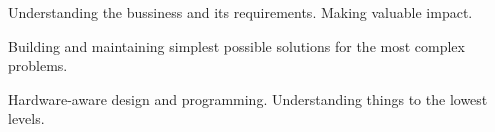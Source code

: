 

\begin{cventries}
    \begin{cvitems}
      \item{Understanding the bussiness and its requirements. Making valuable impact.}
      \item{Building and maintaining simplest possible solutions for the most complex problems.}
      \item{Hardware-aware design and programming. Understanding things to the lowest levels.}
    \end{cvitems}

  \bigskip
\end{cventries}
